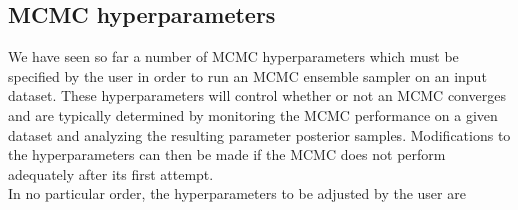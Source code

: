 \subsection{MCMC hyperparameters} \label{sect:mcmcparams}
We have seen so far a number of MCMC hyperparameters which must be specified by the user 
in order to run an MCMC ensemble sampler on an input dataset. These hyperparameters will control 
whether or not an MCMC converges and are typically determined by monitoring the MCMC 
performance on a given dataset and analyzing the resulting parameter posterior samples. 
Modifications to the hyperparameters can then be made if the MCMC does not perform adequately 
after its first attempt. \\

In no particular order, the hyperparameters to be adjusted by the user are 

